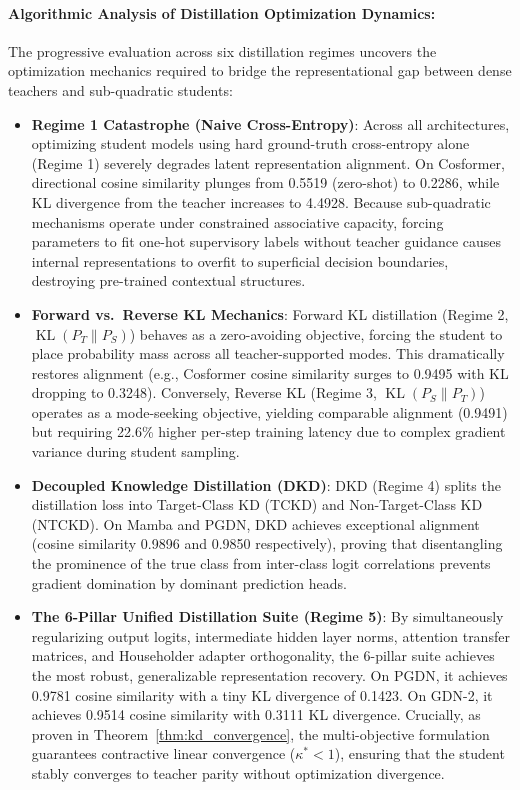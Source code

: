\documentclass{article}
\begin{document}


\paragraph{Algorithmic Analysis of Distillation Optimization Dynamics:}
The progressive evaluation across six distillation regimes uncovers the optimization mechanics required to bridge the representational gap between dense teachers and sub-quadratic students:
\begin{itemize}
    \item \textbf{Regime 1 Catastrophe (Naive Cross-Entropy)}: Across all architectures, optimizing student models using hard ground-truth cross-entropy alone (Regime 1) severely degrades latent representation alignment. On Cosformer, directional cosine similarity plunges from 0.5519 (zero-shot) to 0.2286, while KL divergence from the teacher increases to 4.4928. Because sub-quadratic mechanisms operate under constrained associative capacity, forcing parameters to fit one-hot supervisory labels without teacher guidance causes internal representations to overfit to superficial decision boundaries, destroying pre-trained contextual structures.
    \item \textbf{Forward vs.\ Reverse KL Mechanics}: Forward KL distillation (Regime 2, $\operatorname{KL}(P_T \parallel P_S)$) behaves as a zero-avoiding objective, forcing the student to place probability mass across all teacher-supported modes. This dramatically restores alignment (e.g., Cosformer cosine similarity surges to 0.9495 with KL dropping to 0.3248). Conversely, Reverse KL (Regime 3, $\operatorname{KL}(P_S \parallel P_T)$) operates as a mode-seeking objective, yielding comparable alignment (0.9491) but requiring 22.6\% higher per-step training latency due to complex gradient variance during student sampling.
    \item \textbf{Decoupled Knowledge Distillation (DKD)}: DKD (Regime 4) splits the distillation loss into Target-Class KD (TCKD) and Non-Target-Class KD (NTCKD). On Mamba and PGDN, DKD achieves exceptional alignment (cosine similarity 0.9896 and 0.9850 respectively), proving that disentangling the prominence of the true class from inter-class logit correlations prevents gradient domination by dominant prediction heads.
    \item \textbf{The 6-Pillar Unified Distillation Suite (Regime 5)}: By simultaneously regularizing output logits, intermediate hidden layer norms, attention transfer matrices, and Householder adapter orthogonality, the 6-pillar suite achieves the most robust, generalizable representation recovery. On PGDN, it achieves 0.9781 cosine similarity with a tiny KL divergence of 0.1423. On GDN-2, it achieves 0.9514 cosine similarity with 0.3111 KL divergence. Crucially, as proven in Theorem~\ref{thm:kd_convergence}, the multi-objective formulation guarantees contractive linear convergence ($\kappa^* < 1$), ensuring that the student stably converges to teacher parity without optimization divergence.
\end{itemize}
\end{document}
